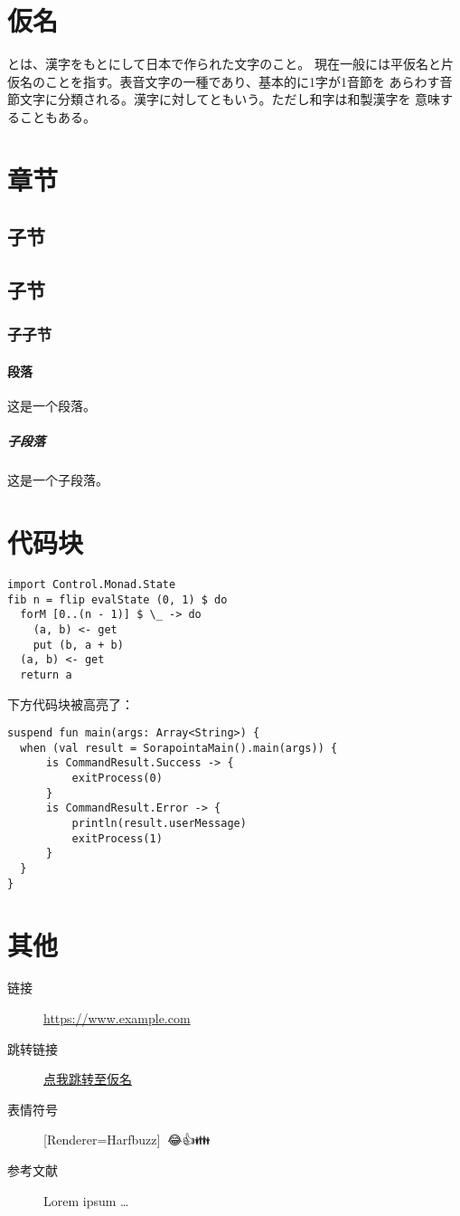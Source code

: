 \documentclass[
  fontset = none,
  punct   = kaiming,
]{ctexart}
\newcommand{\emoji}[1]{
  {\setmainfont{Apple Color Emoji}[Renderer=Harfbuzz]{#1}}
}
\renewcommand{\emph}[1]{\textbf{#1}}
\let\oldurl\url
\renewcommand{\url}[1]{%
{\lmmono\oldurl{#1}}
}
\newcommand{\upcite}[1]{\textsuperscript{\cite{#1}}}
\begin{document}
\newpage
\gothic
\section{仮名} \label{sec:kana}

\emph{}とは、漢字をもとにして日本で作られた文字のこと。
現在一般には平仮名と片仮名のことを指す。表音文字の一種であり、基本的に1字が1音節を
あらわす音節文字に分類される。漢字に対してともいう。ただし和字は和製漢字を
意味することもある。

\newpage
\sans
\section{章节}

\subsection{子节}
\subsection{子节}
\subsubsection{子子节}

\paragraph{段落} 这是一个段落。
\subparagraph{子段落} 这是一个子段落。

\newpage
\section{代码块}

\begin{verbatim}
import Control.Monad.State
fib n = flip evalState (0, 1) $ do
  forM [0..(n - 1)] $ \_ -> do
    (a, b) <- get
    put (b, a + b)
  (a, b) <- get
  return a
\end{verbatim}

下方代码块被高亮了：

\begin{verbatim}
suspend fun main(args: Array<String>) {
  when (val result = SorapointaMain().main(args)) {
      is CommandResult.Success -> {
          exitProcess(0)
      }
      is CommandResult.Error -> {
          println(result.userMessage)
          exitProcess(1)
      }
  }
}
\end{verbatim}

\newpage
\section{其他}

\sans

\begin{description}
  \item[链接] \url{https://www.example.com}
  \item[跳转链接]
    \hyperref[sec:kana]{点我跳转至{\gothic{}仮名}}
  \item[表情符号] \emoji{😶‍🌫️😂👍👪}
  \item[参考文献] Lorem ipsum \ldots \upcite{greenwade93}
\end{description}


\end{document}
